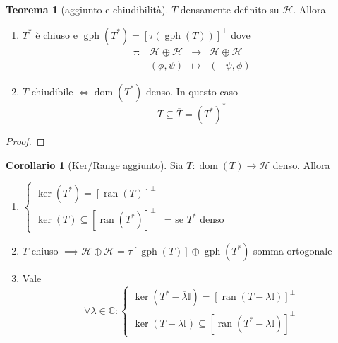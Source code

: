 \documentclass[a4paper,10pt]{article}
\theoremstyle{definition}
\DeclareMathOperator*{\ran}{ran}
\DeclareMathOperator*{\dom}{dom} %
\DeclareMathOperator*{\gr}{gph} %
\newcommand{\im}{\mathbb{C}} %
\newcommand{\hil}{\mathcal{H}} %
\theoremstyle{indentdefinition}
\theoremstyle{indenttheorem}
\newtheorem{thm}{Teorema}
\newtheorem{cor}{Corollario}
\theoremstyle{myremark}
\theoremstyle{indentgeneral}
\newenvironment{myboxed} 
{\noindent\begin{lrbox}{\mybox}\begin{minipage}{\textwidth}}
{\end{minipage}\end{lrbox}\fbox{\usebox{\mybox}}}
\begin{document}
\begin{myboxed}
    \begin{thm}[aggiunto e chiudibilità]\label{thm-aggiunto-chiudibilità}
        $T$ densamente definito su $\hil$. Allora
        \begin{enumerate}
            \item \underline{$T^*$ è chiuso}  e $\gr(T^*)=[\tau(\gr(T))]^\perp$ dove
            $$\begin{array}{cccc}
                \tau: & \hil\oplus\hil & \to & \hil\oplus\hil \\
                 & (\phi,\psi) &\mapsto & (-\psi, \phi)
            \end{array}$$
            \item $T$ chiudibile $\iff \dom(T^*)$ denso. In questo caso
            $$T\subseteq \boxed{\overline{T}=(T^*)^*}$$
        \end{enumerate}
    \end{thm}
\end{myboxed}

\begin{proof}
    \todo{}
\end{proof}

\begin{cor}[Ker/Range aggiunto]\label{cor-ker-range-aggiunto}
    Sia $T:\dom(T)\to \hil$ denso. Allora
    \begin{enumerate}
        \item $\begin{cases}
            \ker(T^*)=[\ran(T)]^\perp\\
             \ker(T)\subseteq[\ran(T^*)]^\perp & \text{= se $T^*$ denso}
        \end{cases}$
        \item $T$ chiuso $\implies \hil\oplus\hil=\tau[\gr(T)]\oplus\gr(T^*)$ somma ortogonale
        \item Vale $$\forall\lambda\in\im:\begin{cases}
            \ker(T^*-\overline{\lambda}\mathbb{I})=[\ran(T-\lambda\mathbb{I})]^\perp\\
            \ker(T-\lambda\mathbb{I})\subseteq[\ran(T^*-\overline{\lambda}\mathbb{I})]^\perp
        \end{cases}$$
    \end{enumerate}
\end{cor}

\pagebreak{}
\end{document}
